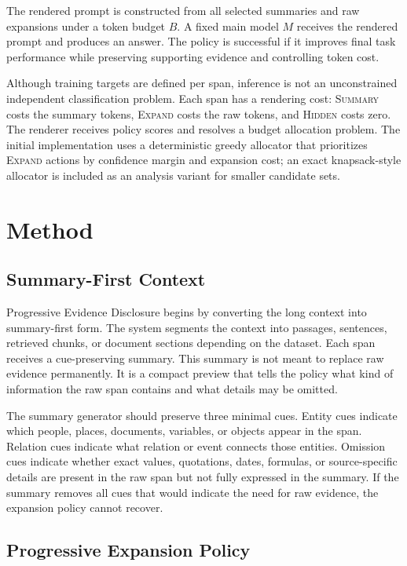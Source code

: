 \documentclass[11pt]{article}
\newcommand{\method}{Progressive Evidence Disclosure}
\newcommand{\expandact}{\textsc{Expand}}
\newcommand{\summaryact}{\textsc{Summary}}
\newcommand{\hiddenact}{\textsc{Hidden}}
\begin{document}
The rendered prompt is constructed from all selected summaries and raw expansions under a token budget $B$. A fixed main model $M$ receives the rendered prompt and produces an answer. The policy is successful if it improves final task performance while preserving supporting evidence and controlling token cost.

Although training targets are defined per span, inference is not an unconstrained independent classification problem. Each span has a rendering cost: \summaryact{} costs the summary tokens, \expandact{} costs the raw tokens, and \hiddenact{} costs zero. The renderer receives policy scores and resolves a budget allocation problem. The initial implementation uses a deterministic greedy allocator that prioritizes \expandact{} actions by confidence margin and expansion cost; an exact knapsack-style allocator is included as an analysis variant for smaller candidate sets.

\section{Method}

\subsection{Summary-First Context}

\method{} begins by converting the long context into summary-first form. The system segments the context into passages, sentences, retrieved chunks, or document sections depending on the dataset. Each span receives a cue-preserving summary. This summary is not meant to replace raw evidence permanently. It is a compact preview that tells the policy what kind of information the raw span contains and what details may be omitted.

The summary generator should preserve three minimal cues. Entity cues indicate which people, places, documents, variables, or objects appear in the span. Relation cues indicate what relation or event connects those entities. Omission cues indicate whether exact values, quotations, dates, formulas, or source-specific details are present in the raw span but not fully expressed in the summary. If the summary removes all cues that would indicate the need for raw evidence, the expansion policy cannot recover.

\subsection{Progressive Expansion Policy}
\end{document}
